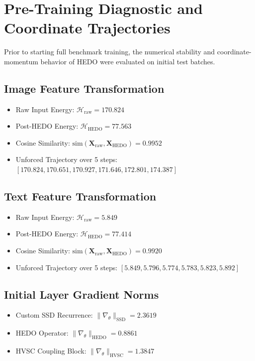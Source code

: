 \documentclass[11pt,journal,onecolumn,draftcls]{IEEEtran}
\begin{document}
\section{Pre-Training Diagnostic and Coordinate Trajectories}
Prior to starting full benchmark training, the numerical stability and coordinate-momentum behavior of HEDO were evaluated on initial test batches.

\subsection{Image Feature Transformation}
\begin{itemize}
    \item Raw Input Energy: $\mathcal{H}_{\text{raw}} = 170.824$
    \item Post-HEDO Energy: $\mathcal{H}_{\text{HEDO}} = 77.563$
    \item Cosine Similarity: $\text{sim}(\mathbf{X}_{\text{raw}}, \mathbf{X}_{\text{HEDO}}) = 0.9952$
    \item Unforced Trajectory over 5 steps: $[170.824, 170.651, 170.927, 171.646, 172.801, 174.387]$
\end{itemize}

\subsection{Text Feature Transformation}
\begin{itemize}
    \item Raw Input Energy: $\mathcal{H}_{\text{raw}} = 5.849$
    \item Post-HEDO Energy: $\mathcal{H}_{\text{HEDO}} = 77.414$
    \item Cosine Similarity: $\text{sim}(\mathbf{X}_{\text{raw}}, \mathbf{X}_{\text{HEDO}}) = 0.9920$
    \item Unforced Trajectory over 5 steps: $[5.849, 5.796, 5.774, 5.783, 5.823, 5.892]$
\end{itemize}

\subsection{Initial Layer Gradient Norms}
\begin{itemize}
    \item Custom SSD Recurrence: $\|\nabla_{\theta}\|_{\text{SSD}} = 2.3619$
    \item HEDO Operator: $\|\nabla_{\theta}\|_{\text{HEDO}} = 0.8861$
    \item HVSC Coupling Block: $\|\nabla_{\theta}\|_{\text{HVSC}} = 1.3847$
\end{itemize}
\end{document}
